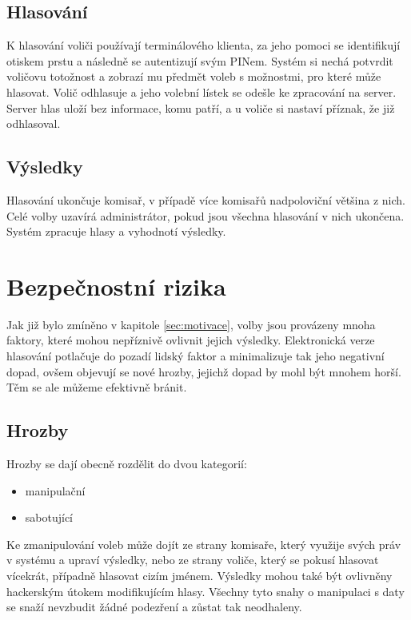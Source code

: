 \documentclass[11pt,twoside,a4paper]{book}
\begin{document}
\subsection{Hlasování}

K hlasování voliči používají terminálového klienta, za jeho pomoci se identifikují otiskem prstu a následně se autentizují svým PINem. Systém si nechá potvrdit voličovu totožnost a zobrazí mu předmět voleb s možnostmi, pro které může hlasovat. Volič odhlasuje a jeho volební lístek se odešle ke zpracování na server. Server hlas uloží bez informace, komu patří, a u voliče si nastaví příznak, že již odhlasoval.

\subsection{Výsledky}

Hlasování ukončuje komisař, v případě více komisařů nadpoloviční většina z nich. Celé volby uzavírá administrátor, pokud jsou všechna hlasování v nich ukončena. Systém zpracuje hlasy a vyhodnotí výsledky.

\section{Bezpečnostní rizika} \label{sec:bezpecnostni_rizika}

Jak již bylo zmíněno v kapitole \ref{sec:motivace}, volby jsou provázeny mnoha faktory, které mohou nepříznivě ovlivnit jejich výsledky. Elektronická verze hlasování potlačuje do pozadí lidský faktor a minimalizuje tak jeho negativní dopad, ovšem objevují se nové hrozby, jejichž dopad by mohl být mnohem horší. Těm se ale můžeme efektivně bránit.

\subsection{Hrozby}

Hrozby se dají obecně rozdělit do dvou kategorií: 

\begin{itemize}
	\item manipulační
	\item sabotující
\end{itemize}	

Ke zmanipulování voleb může dojít ze strany komisaře, který využije svých práv v systému a upraví výsledky, nebo ze strany voliče, který se pokusí hlasovat vícekrát, případně hlasovat cizím jménem. Výsledky mohou také být ovlivněny hackerským útokem modifikujícím hlasy. Všechny tyto snahy o manipulaci s daty se snaží nevzbudit žádné podezření a zůstat tak neodhaleny. 
\end{document}
